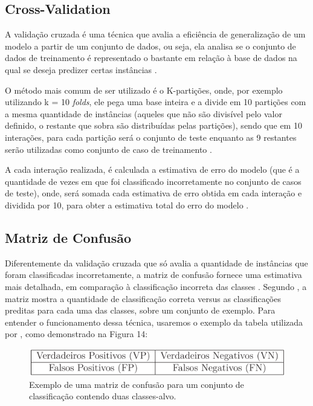 \subsection{Cross-Validation}

\par
A validação cruzada é uma técnica que avalia a eficiência de generalização de um modelo a partir de um conjunto de dados, ou seja, ela analisa se o conjunto de dados de treinamento é representado o bastante em relação à base de dados na qual se deseja predizer certas instâncias \cite{Carvalho2014, Monard2003}.

\par
O método mais comum de ser utilizado é o K-partições, onde, por exemplo utilizando k = 10 \textit{folds}, ele pega uma base inteira e a divide em 10 partições com a mesma quantidade de instâncias (aqueles que não são divisível pelo valor definido, o restante que sobra são distribuídas pelas partições), sendo que em 10 interações, para cada partição será o conjunto de teste enquanto as 9 restantes serão utilizadas como conjunto de caso de treinamento \cite{Carvalho2014}.

\par
A cada interação realizada, é calculada a estimativa de erro do modelo (que é a quantidade de vezes em que foi classificado incorretamente no conjunto de casos de teste), onde, será somada cada estimativa de erro obtida em cada interação e dividida por 10, para obter a estimativa total do erro do modelo \cite{Carvalho2014}.

\subsection{Matriz de Confusão}

\par
Diferentemente da validação cruzada que só avalia a quantidade de instâncias que foram classificadas incorretamente, a matriz de confusão fornece uma estimativa mais detalhada, em comparação à classificação incorreta das classes \cite{Carvalho2014}. Segundo , a matriz mostra a quantidade de classificação correta versus as classificações preditas para cada uma das classes, sobre um conjunto de exemplo. Para entender o funcionamento dessa técnica, usaremos o exemplo da  tabela utilizada por , como demonstrado na Figura 14:

\par
\begin{figure}[!htp]
	\begin{center}
    \caption{\label{fig:waveform_fig} Exemplo de uma matriz de confusão para um conjunto de classificação contendo duas classes-alvo.}
	\includegraphics[scale=0.80]{Figuras/Exemplo_matriz_de_confusao.png}
	\end{center}
\end{figure}


